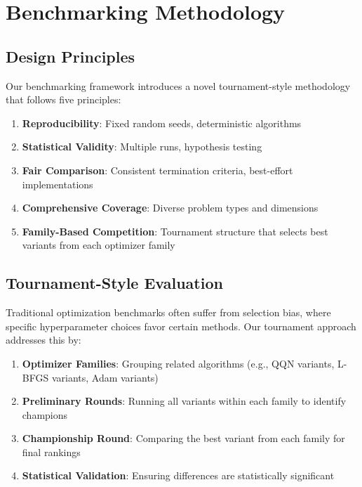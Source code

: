 \hypertarget{benchmarking-methodology}{%
\section{Benchmarking Methodology}\label{benchmarking-methodology}}

\hypertarget{design-principles}{%
\subsection{Design Principles}\label{design-principles}}

Our benchmarking framework introduces a novel tournament-style methodology that follows five principles:

\begin{enumerate}
\def\labelenumi{\arabic{enumi}.}
\tightlist
\item
  \textbf{Reproducibility}: Fixed random seeds, deterministic algorithms
\item
  \textbf{Statistical Validity}: Multiple runs, hypothesis testing
\item
  \textbf{Fair Comparison}: Consistent termination criteria, best-effort implementations
\item
  \textbf{Comprehensive Coverage}: Diverse problem types and dimensions
\item
  \textbf{Family-Based Competition}: Tournament structure that selects best variants from each optimizer family
\end{enumerate}

\hypertarget{tournament-style-evaluation}{%
\subsection{Tournament-Style Evaluation}\label{tournament-style-evaluation}}

Traditional optimization benchmarks often suffer from selection bias, where specific hyperparameter choices favor certain methods. Our tournament approach addresses this by:

\begin{enumerate}
\def\labelenumi{\arabic{enumi}.}
\tightlist
\item
  \textbf{Optimizer Families}: Grouping related algorithms (e.g., QQN variants, L-BFGS variants, Adam variants)
\item
  \textbf{Preliminary Rounds}: Running all variants within each family to identify champions
\item
  \textbf{Championship Round}: Comparing the best variant from each family for final rankings
\item
  \textbf{Statistical Validation}: Ensuring differences are statistically significant
\end{enumerate}

